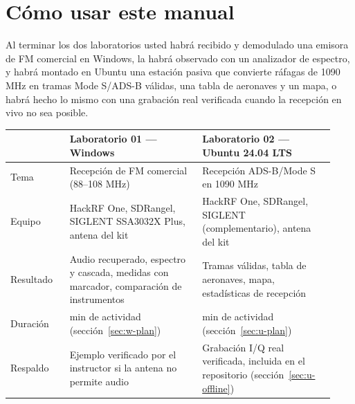 

\section{Cómo usar este manual}

\begin{objetivo}
Al terminar los dos laboratorios usted habrá recibido y demodulado una emisora de FM comercial en Windows, la habrá observado con un analizador de espectro, y habrá montado en Ubuntu una estación pasiva que convierte ráfagas de 1090 MHz en tramas Mode S/ADS-B válidas, una tabla de aeronaves y un mapa, o habrá hecho lo mismo con una grabación real verificada cuando la recepción en vivo no sea posible.
\end{objetivo}

\begin{longtable}{@{}>{\raggedright\arraybackslash}p{0.17\linewidth}>{\raggedright\arraybackslash}p{0.38\linewidth}>{\raggedright\arraybackslash}p{0.38\linewidth}@{}}
\toprule
& \textbf{Laboratorio 01 --- Windows} & \textbf{Laboratorio 02 --- Ubuntu 24.04 LTS} \\
\midrule
\endhead
Tema & Recepción de FM comercial (88--108 MHz) & Recepción ADS-B/Mode S en 1090 MHz \\
Equipo & HackRF One, SDRangel, SIGLENT SSA3032X Plus, antena del kit & HackRF One, SDRangel, SIGLENT (complementario), antena del kit \\
Resultado & Audio recuperado, espectro y cascada, medidas con marcador, comparación de instrumentos & Tramas válidas, tabla de aeronaves, mapa, estadísticas de recepción \\
Duración & 210 min de actividad (sección~\ref{sec:w-plan}) & 225 min de actividad (sección~\ref{sec:u-plan}) \\
Respaldo & Ejemplo verificado por el instructor si la antena no permite audio & Grabación I/Q real verificada, incluida en el repositorio (sección~\ref{sec:u-offline}) \\
\bottomrule
\end{longtable}

